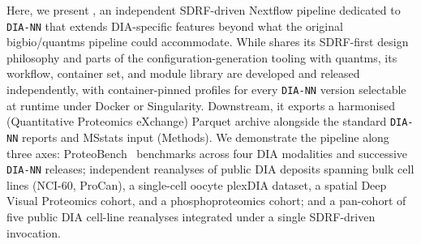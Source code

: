 Here, we present \quantmsdiann{}, an independent SDRF-driven Nextflow pipeline dedicated to \texttt{DIA-NN} that extends DIA-specific features beyond what the original bigbio/quantms pipeline could accommodate. While \quantmsdiann{} shares its SDRF-first design philosophy and parts of the configuration-generation tooling with quantms, its workflow, container set, and module library are developed and released independently, with container-pinned profiles for every \texttt{DIA-NN} version selectable at runtime under Docker or Singularity. Downstream, it exports a harmonised \qpx{} (Quantitative Proteomics eXchange) Parquet archive alongside the standard \texttt{DIA-NN} reports and MSstats input (Methods). We demonstrate the pipeline along three axes: ProteoBench~\cite{devreese2025proteobench} benchmarks across four DIA modalities and successive \texttt{DIA-NN} releases; independent reanalyses of public DIA deposits spanning bulk cell lines (NCI-60, ProCan), a single-cell oocyte plexDIA dataset, a spatial Deep Visual Proteomics cohort, and a phosphoproteomics cohort; and a pan-cohort of five public DIA cell-line reanalyses integrated under a single SDRF-driven invocation.
